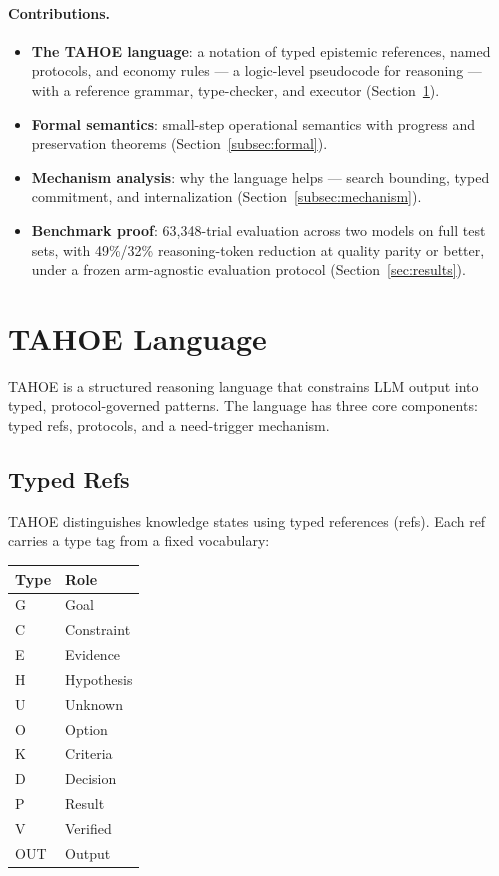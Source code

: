 \documentclass[11pt,a4paper]{article}
\begin{document}
\paragraph{Contributions.}
\begin{itemize}[nosep,leftmargin=*]
    \item \textbf{The TAHOE language}: a notation of typed epistemic references, named protocols, and economy rules --- a logic-level pseudocode for reasoning --- with a reference grammar, type-checker, and executor (Section~\ref{sec:language}).
    \item \textbf{Formal semantics}: small-step operational semantics with progress and preservation theorems (Section~\ref{subsec:formal}).
    \item \textbf{Mechanism analysis}: why the language helps --- search bounding, typed commitment, and internalization (Section~\ref{subsec:mechanism}).
    \item \textbf{Benchmark proof}: 63{,}348-trial evaluation across two models on full test sets, with 49\%/32\% reasoning-token reduction at quality parity or better, under a frozen arm-agnostic evaluation protocol (Section~\ref{sec:results}).
\end{itemize}

\section{TAHOE Language}
\label{sec:language}

TAHOE is a structured reasoning language that constrains LLM output into typed, protocol-governed patterns.
The language has three core components: typed refs, protocols, and a need-trigger mechanism.

\subsection{Typed Refs}
\label{subsec:typed-refs}

TAHOE distinguishes knowledge states using typed references (refs).
Each ref carries a type tag from a fixed vocabulary:

\begin{center}
\begin{tabular}{ll}
\toprule
\textbf{Type} & \textbf{Role} \\
\midrule
G & Goal \\
C & Constraint \\
E & Evidence \\
H & Hypothesis \\
U & Unknown \\
O & Option \\
K & Criteria \\
D & Decision \\
P & Result \\
V & Verified \\
OUT & Output \\
\bottomrule
\end{tabular}
\end{center}
\end{document}

